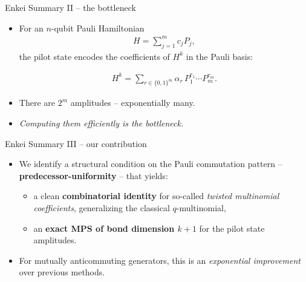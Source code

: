\documentclass{beamer}
\renewcommand{\>}{\rangle}
\newcommand{\<}{\langle}
\begin{document}

\begin{frame}{Enkei Summary II -- the bottleneck}

\begin{itemize}
    \item For an $n$-qubit Pauli Hamiltonian 
    \begin{align*}
        H = \sum_{j=1}^m c_j P_j,
    \end{align*}    
    the pilot state encodes the coefficients of $H^k$ in the Pauli basis:
    
    \begin{align*}
        H^k = \sum_{r\in\{0,1\}^m} \alpha_r \, P_1^{r_1}\cdots P_m^{r_m}.
    \end{align*}
    
    \bigskip
    \item There are $2^m$ amplitudes -- exponentially many.

    \bigskip
    \item \emph{Computing them efficiently is the bottleneck.}
\end{itemize}
\end{frame}


\begin{frame}{Enkei Summary III -- our contribution}

\begin{itemize}
    \item We identify a structural condition on the Pauli commutation
    pattern -- \textbf{predecessor-uniformity} -- that yields:

    \medskip
    \begin{itemize}
        \item a clean \textbf{combinatorial identity} for so-called
        \emph{twisted multinomial coefficients}, generalizing the
        classical $q$-multinomial,

        \medskip
        \item an \textbf{exact MPS of bond dimension $k+1$} for the
        pilot state amplitudes.
    \end{itemize}

    \bigskip
    \item For mutually anticommuting generators, this is an
    \emph{exponential improvement} over previous methods.
\end{itemize}
\end{frame}
\end{document}
